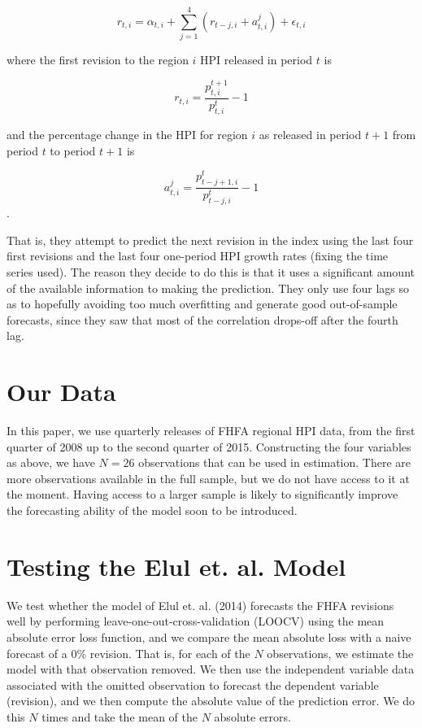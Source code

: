 \documentclass[AER]{AEA}
\begin{document}
\[
r_{t,i} = \alpha_{t,i} + \sum_{j=1}^4 (r_{t-j,i} + a_{t,i}^j) + \epsilon_{t,i}
\]

where the first revision to the region $i$ HPI released in period $t$ is 

\[
r_{t,i} = \frac{p_{t,i}^{t+1}}{p_{t,i}^t} - 1
\]

and the percentage change in the HPI for region $i$ as released in period $t+1$ from period $t$ to period $t+1$ is

\[
a_{t,i}^j = \frac{p_{t-j+1,i}^{t}}{p_{t-j,i}^{t}} - 1
\].

That is, they attempt to predict the next revision in the index using the last four first revisions and the last four one-period HPI growth rates (fixing the time series used). The reason they decide to do this is that it uses a significant amount of the available information to making the prediction. They only use four lags so as to hopefully avoiding too much overfitting and generate good out-of-sample forecasts, since they saw that most of the correlation drops-off after the fourth lag.

\section{Our Data}

In this paper, we use quarterly releases of FHFA regional HPI data, from the first quarter of 2008 up to the second quarter of 2015. Constructing the four variables as above, we have $N=26$ observations that can be used in estimation. There are more observations available in the full sample, but we do not have access to it at the moment. Having access to a larger sample is likely to significantly improve the forecasting ability of the model soon to be introduced.

\section{Testing the Elul et. al. Model}

We test whether the model of Elul et. al. (2014) forecasts the FHFA revisions well by performing leave-one-out-cross-validation (LOOCV) using the mean absolute error loss function, and we compare the mean absolute loss with a naive forecast of a 0\% revision. That is, for each of the $N$ observations, we estimate the model with that observation removed. We then use the independent variable data associated with the omitted observation to forecast the dependent variable (revision), and we then compute the absolute value of the prediction error. We do this $N$ times and take the mean of the $N$ absolute errors. 
\end{document}
